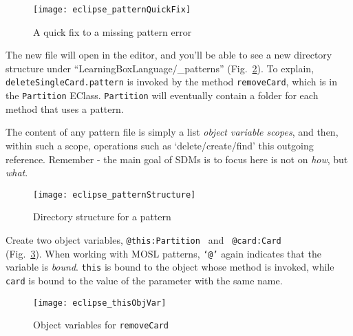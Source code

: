 \begin{itemize}
\vspace{0.5cm}

\begin{figure}[htp]
\begin{center}
  \texttt{[image: eclipse\_patternQuickFix]}
  \caption{A quick fix to a missing pattern error}
  \label{eclipse:quickFix}
\end{center}
\end{figure}

\itemWithRightTriangle The new file will open in the editor, and you'll be able to see a new directory structure under ``LearningBoxLanguage/\_patterns''
(Fig.~\ref{eclipse:pattStruct}). To explain, \texttt{deleteSingleCard.pattern} is invoked by the method \texttt{removeCard}, which is in the \texttt{Partition}
EClass. \texttt{Partition} will eventually contain a folder for each method that uses a pattern.

\vspace{0.5cm}

\itemWithRightTriangle The content of any pattern file is simply a list \emph{object variable scopes}, and then,
within such a scope, operations such as `delete/create/find' this outgoing reference. Remember - the main goal of SDMs is to focus here is not on \emph{how},
but \emph{what}.


\begin{figure}[htp]
\begin{center}
  \texttt{[image: eclipse\_patternStructure]}
  \caption{Directory structure for a pattern}
  \label{eclipse:pattStruct}
\end{center}
\end{figure}

\itemWithRightTriangle Create two object variables, \texttt{@this:Partition } and \texttt{ @card:Card}\\ (Fig.~\ref{eclipse:remCardObjVar}). When working
with MOSL patterns, \texttt{`@'} again indicates that the variable is \emph{bound}. \texttt{this} is bound to the object whose method is invoked,
while \texttt{card} is bound to the value of the parameter with the same name.

\begin{figure}[htp]
\begin{center}
  \texttt{[image: eclipse\_thisObjVar]}
  \caption{Object variables for \texttt{removeCard}}
  \label{eclipse:remCardObjVar}
\end{center}
\end{figure}


\end{itemize}
